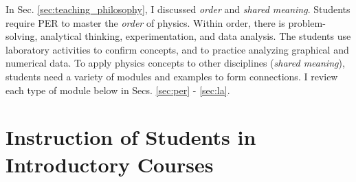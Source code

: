 \documentclass[../../../main.tex]{subfiles}
\begin{document}
\label{sec:methods}

In Sec. \ref{sec:teaching_philosophy}, I discussed \textit{order} and \textit{shared meaning}.  Students require PER to master the \textit{order} of physics.  Within order, there is problem-solving, analytical thinking, experimentation, and data analysis.  The students use laboratory activities to confirm concepts, and to practice analyzing graphical and numerical data.  To apply physics concepts to other disciplines (\textit{shared meaning}), students need a variety of modules and examples to form connections.  I review each type of module below in Secs. \ref{sec:per} - \ref{sec:la}.

\section{Instruction of Students in Introductory Courses}
\end{document}
